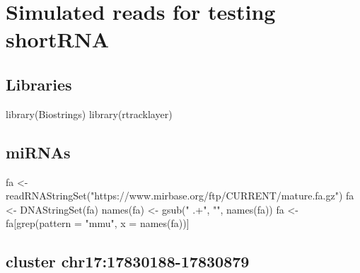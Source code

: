 \documentclass[12pt,twoside]{reedthesis}
\newenvironment{Shaded}{\begin{snugshade}}{\end{snugshade}}
\newcommand{\AttributeTok}[1]{\textcolor[rgb]{0.77,0.63,0.00}{#1}}
\newcommand{\FunctionTok}[1]{\textcolor[rgb]{0.00,0.00,0.00}{#1}}
\newcommand{\NormalTok}[1]{#1}
\newcommand{\OtherTok}[1]{\textcolor[rgb]{0.56,0.35,0.01}{#1}}
\newcommand{\StringTok}[1]{\textcolor[rgb]{0.31,0.60,0.02}{#1}}
\begin{document}
\noindent

\setlength\parindent{0pt}

\hypertarget{simulated-reads-for-testing-shortrna}{%
\section*{Simulated reads for testing shortRNA}\label{simulated-reads-for-testing-shortrna}}

\hypertarget{libraries}{%
\subsection*{Libraries}\label{libraries}}
\begin{Shaded}
\begin{Highlighting}[]
\FunctionTok{library}\NormalTok{(Biostrings)}
\FunctionTok{library}\NormalTok{(rtracklayer)}
\end{Highlighting}
\end{Shaded}
\hypertarget{mirnas}{%
\subsection*{miRNAs}\label{mirnas}}
\begin{Shaded}
\begin{Highlighting}[]
\NormalTok{fa }\OtherTok{\textless{}{-}} \FunctionTok{readRNAStringSet}\NormalTok{(}\StringTok{"https://www.mirbase.org/ftp/CURRENT/mature.fa.gz"}\NormalTok{)}
\NormalTok{fa }\OtherTok{\textless{}{-}} \FunctionTok{DNAStringSet}\NormalTok{(fa)}
\FunctionTok{names}\NormalTok{(fa) }\OtherTok{\textless{}{-}} \FunctionTok{gsub}\NormalTok{(}\StringTok{" .+"}\NormalTok{, }\StringTok{""}\NormalTok{, }\FunctionTok{names}\NormalTok{(fa))}
\NormalTok{fa }\OtherTok{\textless{}{-}}\NormalTok{ fa[}\FunctionTok{grep}\NormalTok{(}\AttributeTok{pattern =} \StringTok{"mmu"}\NormalTok{, }\AttributeTok{x =} \FunctionTok{names}\NormalTok{(fa))]}
\end{Highlighting}
\end{Shaded}
\hypertarget{cluster-chr1717830188-17830879}{%
\subsection*{cluster chr17:17830188-17830879}\label{cluster-chr1717830188-17830879}}
\end{document}
